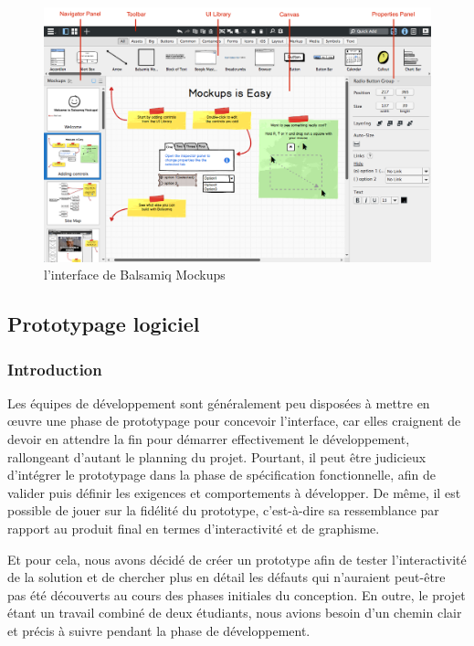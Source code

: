 \begin{figure}[h]
	\centering
		\includegraphics[width=14cm]{Images/chapter3/balsamiq_ui_overview.png}
		\caption{{\footnotesize l'interface de Balsamiq Mockups}}
\end{figure}


\newpage
\subsection{Prototypage logiciel}
\subsubsection{Introduction}
Les équipes de développement sont généralement peu disposées à mettre en œuvre une phase de prototypage pour concevoir l’interface, car elles craignent de devoir en attendre la fin pour démarrer effectivement le développement, rallongeant d’autant le planning du projet. Pourtant, il peut être judicieux d'intégrer le prototypage dans la phase de spécification fonctionnelle, afin de valider puis définir les exigences et comportements à développer. De même, il est possible de jouer sur la fidélité du prototype, c’est-à-dire sa ressemblance par rapport au produit final en termes d’interactivité et de graphisme.

Et pour cela, nous avons décidé de créer un prototype afin de tester l'interactivité de la solution et de chercher plus en détail les défauts qui n'auraient peut-être pas été découverts au cours des phases initiales du conception. En outre, le projet étant un travail combiné de deux étudiants, nous avions besoin d’un chemin clair et précis à suivre pendant la phase de développement.


